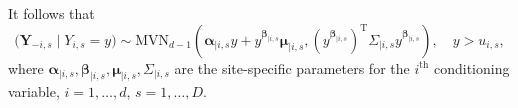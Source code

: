 \documentclass[12pt,compact]{article}
\DeclareMathOperator{\CE}{\mathrm{CE}}
\newcommand{\mvmean}[1]{\symbf{\alpha}_{\mid i, #1} y + y^{\symbf{\beta}_{\mid i, #1}} \symbf{\mu}_{\mid i, #1}}
\newcommand{\mvcov}[1]{\left(y^{\symbf{\beta}_{\mid i, #1}}\right)^{\mathrm{T}} \Sigma_{\mid i, #1} y^{\symbf{\beta}_{\mid i, #1}}}
\begin{document}
It follows that 
\begin{equation}\label{eq:ce_norm}
  \bigl(\symbf{Y}_{-i, s} \mid Y_{i, s} = y\bigr) \sim \mbox{MVN}_{d-1}\left(\mvmean{s}, \mvcov{s}\right),\quad y > u_{i, s},
\end{equation}
where $\symbf{\alpha}_{\mid i, s}, \symbf{\beta}_{\mid i, s}, \symbf{\mu}_{\mid i, s}, \Sigma_{\mid i, s}$ are the site-specific parameters for the $i^{\text{th}}$ conditioning variable, $i = 1, \ldots, d$, $s = 1, \ldots, D$. %
\end{document}
